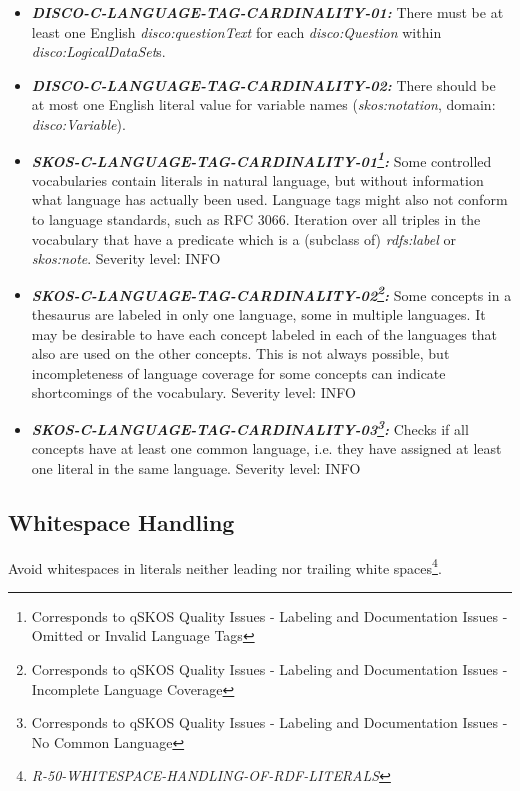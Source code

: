 \documentclass{llncs}
\begin{document}
\begin{itemize}
	\item \textbf{{\em DISCO-C-LANGUAGE-TAG-CARDINALITY-01:}}
There must be at least one English {\em disco:questionText} for each {\em disco:Question} within {\em disco:LogicalDataSet}s.
  \item \textbf{{\em DISCO-C-LANGUAGE-TAG-CARDINALITY-02:}}
There should be at most one English literal value for variable names ({\em skos:notation}, domain: {\em disco:Variable}).
\end{itemize}

\begin{itemize}
	\item \textbf{{\em SKOS-C-LANGUAGE-TAG-CARDINALITY-01\footnote{Corresponds to qSKOS Quality Issues - Labeling and Documentation Issues - Omitted or Invalid Language Tags}:}}
Some controlled vocabularies contain literals in natural language, but without information what language has actually been used. Language tags might also not conform to language standards, such as RFC 3066. 
Iteration over all triples in the vocabulary that have a predicate which is a (subclass of) \emph{rdfs:label} or \emph{skos:note}. 
Severity level: INFO
  \item \textbf{{\em SKOS-C-LANGUAGE-TAG-CARDINALITY-02\footnote{Corresponds to qSKOS Quality Issues - Labeling and Documentation Issues - Incomplete Language Coverage}:}}
	Some concepts in a thesaurus are labeled in only one language, some in multiple languages. It may be desirable to have each concept labeled in each of the languages that also are used on the other concepts. This is not always possible, but incompleteness of language coverage for some concepts can indicate shortcomings of the vocabulary. 
	Severity level: INFO
	\item \textbf{{\em SKOS-C-LANGUAGE-TAG-CARDINALITY-03\footnote{Corresponds to qSKOS Quality Issues - Labeling and Documentation Issues - No Common Language}:}}
	Checks if all concepts have at least one common language, i.e. they have assigned at least one literal in the same language. 
	Severity level: INFO
\end{itemize}

\subsection{Whitespace Handling}

Avoid whitespaces in literals neither leading nor trailing white spaces\footnote{\emph{R-50-WHITESPACE-HANDLING-OF-RDF-LITERALS}}.
\end{document}
